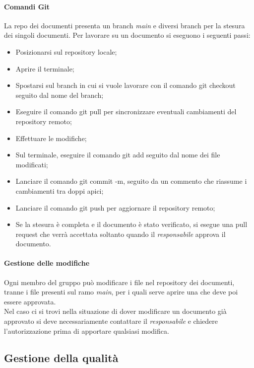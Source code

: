 \paragraph{Comandi Git}
\label{par:comandi_git}
La repo dei documenti presenta un branch \emph{main} e diversi branch per la stesura dei singoli documenti. Per 
lavorare su un documento si eseguono i seguenti passi:
\begin{itemize}
    \item Posizionarsi sul repository locale;
    \item Aprire il terminale;
    \item Spostarsi sul branch in cui si vuole lavorare con il comando git checkout seguito dal nome del branch;
    \item Eseguire il comando git pull per sincronizzare eventuali cambiamenti del repository remoto;
    \item Effettuare le modifiche;
    \item Sul terminale, eseguire il comando git add seguito dal nome dei file modificati;
    \item Lanciare il comando git commit -m, seguito da un commento che riassume i cambiamenti tra doppi apici;
    \item Lanciare il comando git push per aggiornare il repository remoto;
    \item Se la stesura è completa e il documento è stato verificato, si esegue una pull request che verrà accettata soltanto quando il \emph{responsabile} approva il documento.
\end{itemize}

\paragraph{Gestione delle modifiche}
\label{par:gestione_modifiche}
Ogni membro del gruppo può modificare i file nel repository dei documenti, tranne i file presenti sul ramo \emph{main}, 
per i quali serve aprire una  che deve poi essere approvata.\\
Nel caso ci si trovi nella situazione di dover modificare un documento già approvato si deve necessariamente contattare 
il \emph{responsabile} e chiedere l'autorizzazione prima di apportare qualsiasi modifica.

\subsection{Gestione della qualità}
\label{sub:gestione_qualita}

